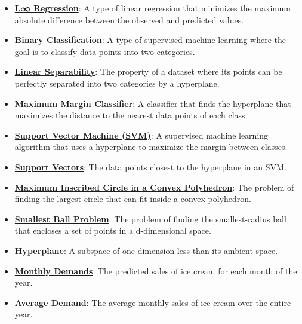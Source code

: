 \documentclass{article}%
\begin{document}
\begin{itemize}[leftmargin=*]
\item \href{https://www.math.purdue.edu/~yipn/421/2024-10-22-Regression.pdf#page=6}{\textbf{L∞ Regression}}: A type of linear regression that minimizes the maximum absolute difference between the observed and predicted values. %
\item \href{https://www.math.purdue.edu/~yipn/421/2024-10-22-Regression.pdf#page=7}{\textbf{Binary Classification}}: A type of supervised machine learning where the goal is to classify data points into two categories. %
\item \href{https://www.math.purdue.edu/~yipn/421/2024-10-22-Regression.pdf#page=8}{\textbf{Linear Separability}}: The property of a dataset where its points can be perfectly separated into two categories by a hyperplane. %
\item \href{https://www.math.purdue.edu/~yipn/421/2024-10-22-Regression.pdf#page=9}{\textbf{Maximum Margin Classifier}}: A classifier that finds the hyperplane that maximizes the distance to the nearest data points of each class. %
\item \href{https://www.math.purdue.edu/~yipn/421/2024-10-22-Regression.pdf#page=10}{\textbf{Support Vector Machine (SVM)}}: A supervised machine learning algorithm that uses a hyperplane to maximize the margin between classes. %
\item \href{https://www.math.purdue.edu/~yipn/421/2024-10-22-Regression.pdf#page=10}{\textbf{Support Vectors}}: The data points closest to the hyperplane in an SVM. %
\item \href{https://www.math.purdue.edu/~yipn/421/2024-10-22-Regression.pdf#page=15}{\textbf{Maximum Inscribed Circle in a Convex Polyhedron}}: The problem of finding the largest circle that can fit inside a convex polyhedron. %
\item \href{https://www.math.purdue.edu/~yipn/421/2024-10-22-Regression.pdf#page=22}{\textbf{Smallest Ball Problem}}: The problem of finding the smallest-radius ball that encloses a set of points in a d-dimensional space. %
\item \href{https://www.math.purdue.edu/~yipn/421/2024-10-22-Regression.pdf#page=7}{\textbf{Hyperplane}}: A subspace of one dimension less than its ambient space. %
\item \href{https://www.math.purdue.edu/~yipn/421/2024-10-28-ApplsLinProg.pdf#page=1}{\textbf{Monthly Demands}}: The predicted sales of ice cream for each month of the year.%
\item \href{https://www.math.purdue.edu/~yipn/421/2024-10-28-ApplsLinProg.pdf#page=2}{\textbf{Average Demand}}: The average monthly sales of ice cream over the entire year.%

\end{itemize}
\end{document}
